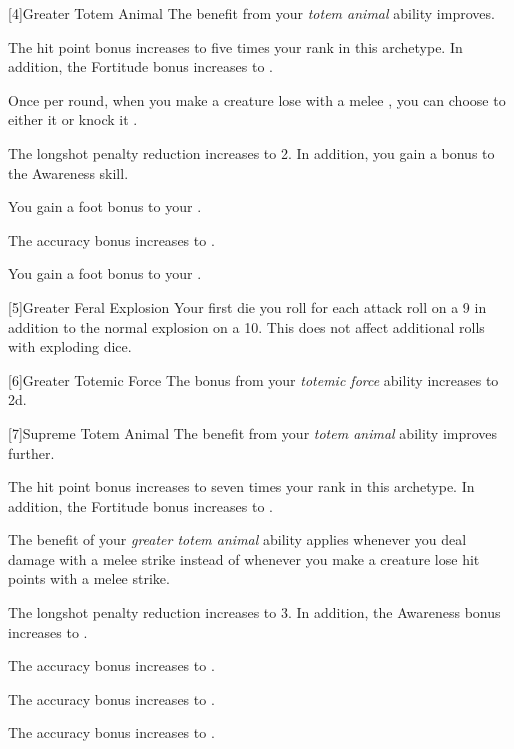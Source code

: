         [4]{Greater Totem Animal} The benefit from your \textit{totem animal} ability improves.
        {
             The hit point bonus increases to five times your rank in this archetype.
            In addition, the Fortitude bonus increases to .

             Once per round, when you make a creature lose  with a melee , you can choose to either  it or knock it .

             The longshot penalty reduction increases to 2.
            In addition, you gain a  bonus to the Awareness skill.

             You gain a  foot bonus to your .

             The accuracy bonus increases to .

             You gain a  foot bonus to your .
        }

        [5]{Greater Feral Explosion} Your first die you roll for each attack roll  on a 9 in addition to the normal explosion on a 10.
        This does not affect additional rolls with exploding dice.

        [6]{Greater Totemic Force} The bonus from your \textit{totemic force} ability increases to \plus2d.

        [7]{Supreme Totem Animal} The benefit from your \textit{totem animal} ability improves further.
        {
             The hit point bonus increases to seven times your rank in this archetype.
            In addition, the Fortitude bonus increases to .

             The benefit of your \textit{greater totem animal} ability applies whenever you deal damage with a melee strike instead of whenever you make a creature lose hit points with a melee strike.

             The longshot penalty reduction increases to 3.
            In addition, the Awareness bonus increases to .

             The accuracy bonus increases to .

             The accuracy bonus increases to .

             The accuracy bonus increases to .
        }

